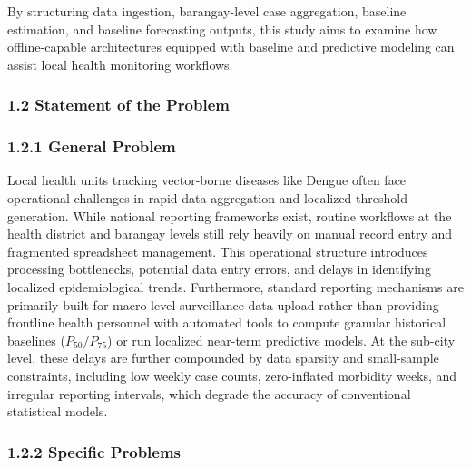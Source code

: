 \documentclass[
]{article}
\begin{document}
By structuring data ingestion, barangay-level case aggregation, baseline
estimation, and baseline forecasting outputs, this study aims to examine
how offline-capable architectures equipped with baseline and predictive
modeling can assist local health monitoring workflows.

\subsubsection{\texorpdfstring{\textbf{1.2 Statement of the
Problem}}{1.2 Statement of the Problem}}\label{statement-of-the-problem}

\subsubsection{\texorpdfstring{\textbf{1.2.1 General
Problem}}{1.2.1 General Problem}}\label{general-problem}

Local health units tracking vector-borne diseases like Dengue often face
operational challenges in rapid data aggregation and localized threshold
generation. While national reporting frameworks exist, routine workflows
at the health district and barangay levels still rely heavily on manual
record entry and fragmented spreadsheet management. This operational
structure introduces processing bottlenecks, potential data entry
errors, and delays in identifying localized epidemiological trends.
Furthermore, standard reporting mechanisms are primarily built for
macro-level surveillance data upload rather than providing frontline
health personnel with automated tools to compute granular historical
baselines (\(P_{50}/P_{75}\)) or run localized near-term predictive
models. At the sub-city level, these delays are further compounded by
data sparsity and small-sample constraints, including low weekly case
counts, zero-inflated morbidity weeks, and irregular reporting
intervals, which degrade the accuracy of conventional statistical
models.

\subsubsection{\texorpdfstring{\textbf{1.2.2 Specific
Problems}}{1.2.2 Specific Problems}}\label{specific-problems}
\end{document}
